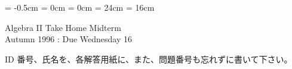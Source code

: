 

\topmargin = -0.5cm
\oddsidemargin = 0cm \evensidemargin = 0cm
\textheight = 24cm \textwidth = 16cm %

\pagestyle{empty}

\newtheorem{thm}{定理}
\newcommand{\bZ}{\mbox{\boldmath $Z$}}
\newcommand{\bQ}{\mbox{\boldmath $Q$}}
\newcommand{\bR}{\mbox{\boldmath $R$}}
\newcommand{\bC}{\mbox{\boldmath $C$}}
\newcommand{\bigx}{{\large $\times$}}


\begin{center}
{\gt\LARGE Algebra II  Take Home Midterm}\\
{\gt Autumn 1996 : Due Wednesday 16}
\end{center}

\noindent
ID 番号、氏名を、各解答用紙に、また、問題番号も忘れずに書いて下さい。

